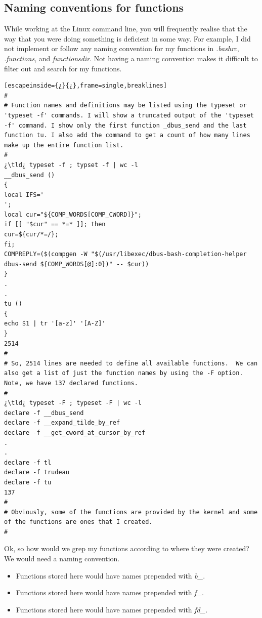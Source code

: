 \subsection{Naming conventions for functions}

While working at the Linux command line, you will frequently realise that the way that you were doing something is deficient in some way. For example, I did not implement or follow any naming convention for my functions in \textsl{\ttb{}.bashrc}, \textsl{\ttb{}.functions}, and \textsl{\ttb{}functionsdir}. Not having a naming convention makes it difficult to filter out and search for my functions.

\begin{lstlisting}[escapeinside={¿}{¿},frame=single,breaklines]
#
# Function names and definitions may be listed using the typeset or 'typeset -f' commands. I will show a truncated output of the 'typeset -f' command. I show only the first function _dbus_send and the last function tu. I also add the command to get a count of how many lines make up the entire function list.
#
¿\tld¿ typeset -f ; typset -f | wc -l
__dbus_send () 
{ 
local IFS='
';
local cur="${COMP_WORDS[COMP_CWORD]}";
if [[ "$cur" == *=* ]]; then
cur=${cur/*=/};
fi;
COMPREPLY=($(compgen -W "$(/usr/libexec/dbus-bash-completion-helper dbus-send ${COMP_WORDS[@]:0})" -- $cur))
}
.
.
tu () 
{ 
echo $1 | tr '[a-z]' '[A-Z]'
}
2514
#
# So, 2514 lines are needed to define all available functions.  We can also get a list of just the function names by using the -F option. Note, we have 137 declared functions.
#
¿\tld¿ typeset -F ; typeset -F | wc -l
declare -f __dbus_send
declare -f __expand_tilde_by_ref
declare -f __get_cword_at_cursor_by_ref
.
.
declare -f tl
declare -f trudeau
declare -f tu
137
#
# Obviously, some of the functions are provided by the kernel and some of the functions are ones that I created.
#
\end{lstlisting}

Ok, so how would we grep my functions according to where they were created? We would need a naming convention.

\begin{itemize}
	\item[]  Functions stored here would have names prepended with \textsl{b\_}.
	\item[]  Functions stored here would have names prepended with \textsl{f\_}.
	\item[]  Functions stored here would have names prepended with \textsl{fd\_}.
\end{itemize}

